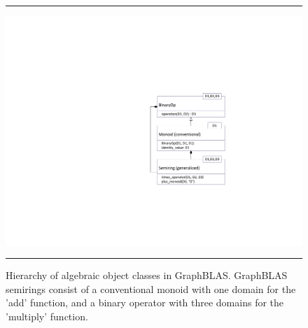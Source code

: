 \begin{figure}[htb]
    \hrule
    \begin{center}
        \includegraphics[width=1.0\linewidth,trim=3in 2in 0.5in 2in]{Algebra_Hierarchy_v2.pdf}
    \end{center}
    \caption{Hierarchy of algebraic object classes in GraphBLAS. GraphBLAS semirings consist of a conventional monoid with one domain for the 'add' function, and a binary operator with three domains for the 'multiply' function.}
    \label{Fig:AlgebraHierarchy}
    \hrule
\end{figure}

